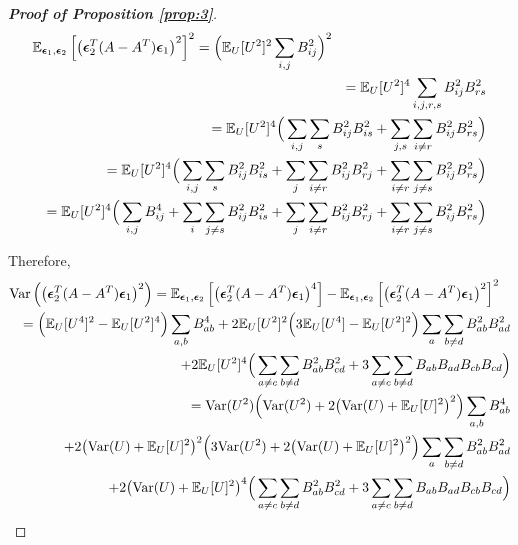 \documentclass{article}
\theoremstyle{definition}
\theoremstyle{remark}
\begin{document}
\begin{proof}[\textbf{Proof of Proposition \ref{prop:3}}]
\begin{eqnarray*}
			\lefteqn{\mathbb{E}_{\bm{\epsilon}_{1},\bm{\epsilon}_{2}}\left[\left(\bm{\epsilon}_{2}^{T}(A-A^{T})\bm{\epsilon}_{1}\right)^{2}\right]^{2}=\Big(\mathbb{E}_{U}[U^{2}]^{2}\sum_{i,j}B_{ij}^{2}\Big)^{2}}&\\
			&&=\mathbb{E}_{U}[U^{2}]^{4}\sum_{i,j,r,s}B_{ij}^{2}B_{rs}^{2}\\
			&&=\mathbb{E}_{U}[U^{2}]^{4}\Big(\sum_{i,j}\sum_{s}B_{ij}^{2}B_{is}^{2}+\sum_{j,s}\sum_{i\ne r}B_{ij}^{2}B_{rs}^{2}\Big)\\
			&&=\mathbb{E}_{U}[U^{2}]^{4}\Big(\sum_{i,j}\sum_{s}B_{ij}^{2}B_{is}^{2}+\sum_{j}\sum_{i\ne r}B_{ij}^{2}B_{rj}^{2}+\sum_{i\ne r}\sum_{j\ne s}B_{ij}^{2}B_{rs}^{2}\Big)\\
			&&=\mathbb{E}_{U}[U^{2}]^{4}\Big(\sum_{i,j}B_{ij}^{4}+\sum_{i}\sum_{j\ne s}B_{ij}^{2}B_{is}^{2}+\sum_{j}\sum_{i\ne r}B_{ij}^{2}B_{rj}^{2}+\sum_{i\ne r}\sum_{j\ne s}B_{ij}^{2}B_{rs}^{2}\Big)\\
		\end{eqnarray*}
		
		Therefore,
		\begin{eqnarray*}
			\lefteqn{\text{Var}\left(\left(\bm{\epsilon}_{2}^{T}(A-A^{T})\bm{\epsilon}_{1}\right)^{2}\right)=\mathbb{E}_{\bm{\epsilon}_{1},\bm{\epsilon}_{2}}\left[\left(\bm{\epsilon}_{2}^{T}(A-A^{T})\bm{\epsilon}_{1}\right)^{4}\right]-\mathbb{E}_{\bm{\epsilon}_{1},\bm{\epsilon}_{2}}\left[\left(\bm{\epsilon}_{2}^{T}(A-A^{T})\bm{\epsilon}_{1}\right)^{2}\right]^{2}}&\\
			&&=\Big(\mathbb{E}_{U}[U^{4}]^{2}-\mathbb{E}_{U}[U^{2}]^{4}\Big)\sum_{a,b}B_{ab}^{4}+2\mathbb{E}_{U}[U^{2}]^{2}\Big(3\mathbb{E}_{U}[U^{4}]-\mathbb{E}_{U}[U^{2}]^{2}\Big)\sum_{a}\sum_{b\ne d}B_{ab}^{2}B_{ad}^{2}\\
			&&\quad+2\mathbb{E}_{U}[U^{2}]^{4}\Big(\sum_{a\neq c}\sum_{b\neq d}B_{ab}^{2}B_{cd}^{2}+3\sum_{a\ne c}\sum_{b\ne d}B_{ab}B_{ad}B_{cb}B_{cd}\Big)\\
			&&=\text{Var}(U^{2})\Big(\text{Var}(U^{2})+2\big(\text{Var}(U)+\mathbb{E}_{U}[U]^{2}\big)^{2}\Big)\sum_{a,b}B_{ab}^{4}\\
			&&\quad+2\big(\text{Var}(U)+\mathbb{E}_{U}[U]^{2}\big)^{2}\Big(3\text{Var}(U^{2})+2\big(\text{Var}(U)+\mathbb{E}_{U}[U]^{2}\big)^{2}\Big)\sum_{a}\sum_{b\ne d}B_{ab}^{2}B_{ad}^{2}\\
			&&\quad+2\big(\text{Var}(U)+\mathbb{E}_{U}[U]^{2}\big)^{4}\Big(\sum_{a\neq c}\sum_{b\neq d}B_{ab}^{2}B_{cd}^{2}+3\sum_{a\ne c}\sum_{b\ne d}B_{ab}B_{ad}B_{cb}B_{cd}\Big)
		\end{eqnarray*}
	\end{proof}
	
\end{document}
